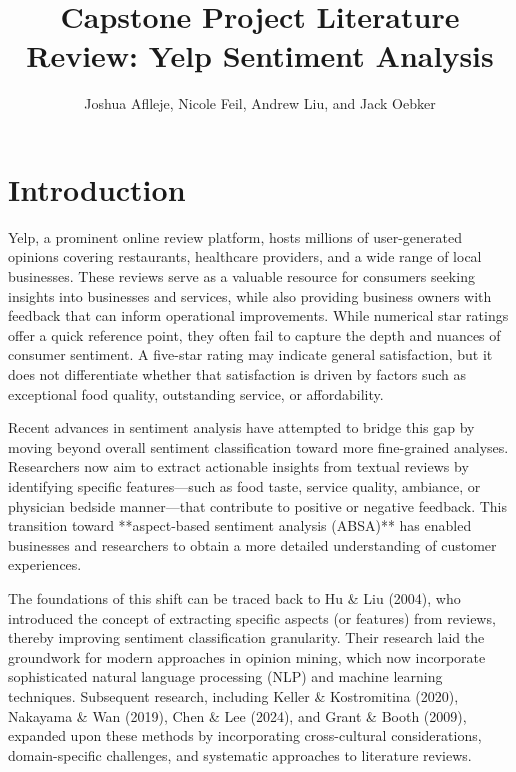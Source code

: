 \documentclass{article}
\title{Capstone Project Literature Review: Yelp Sentiment Analysis}
\author{Joshua Aflleje, Nicole Feil, Andrew Liu, and Jack Oebker}
\begin{document}
\maketitle

\section{Introduction}

Yelp, a prominent online review platform, hosts millions of user-generated opinions covering restaurants, healthcare providers, and a wide range of local businesses. These reviews serve as a valuable resource for consumers seeking insights into businesses and services, while also providing business owners with feedback that can inform operational improvements. While numerical star ratings offer a quick reference point, they often fail to capture the depth and nuances of consumer sentiment. A five-star rating may indicate general satisfaction, but it does not differentiate whether that satisfaction is driven by factors such as exceptional food quality, outstanding service, or affordability.

Recent advances in sentiment analysis have attempted to bridge this gap by moving beyond overall sentiment classification toward more fine-grained analyses. Researchers now aim to extract actionable insights from textual reviews by identifying specific features—such as food taste, service quality, ambiance, or physician bedside manner—that contribute to positive or negative feedback. This transition toward **aspect-based sentiment analysis (ABSA)** has enabled businesses and researchers to obtain a more detailed understanding of customer experiences.

The foundations of this shift can be traced back to Hu \& Liu (2004)\cite{HuLiu2004}, who introduced the concept of extracting specific aspects (or features) from reviews, thereby improving sentiment classification granularity. Their research laid the groundwork for modern approaches in opinion mining, which now incorporate sophisticated natural language processing (NLP) and machine learning techniques. Subsequent research, including Keller \& Kostromitina (2020)\cite{KellerKostromitina2020}, Nakayama \& Wan (2019)\cite{NakayamaWan2019}, Chen \& Lee (2024)\cite{ChenLee2024UPRa}, and Grant \& Booth (2009)\cite{GrantBooth2009}, expanded upon these methods by incorporating cross-cultural considerations, domain-specific challenges, and systematic approaches to literature reviews.
\end{document}
